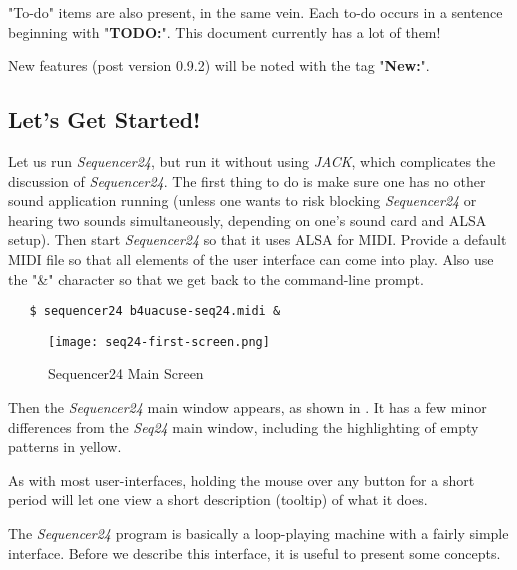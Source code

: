 \documentclass[
 11pt,
 twoside,
 a4paper,
 headinclude,
 footinclude,
 final                                 %
]{article}
\begin{document}
   "To-do" items
   are also present, in the same vein.
   Each to-do occurs in a sentence beginning with "\textbf{TODO:}".
   This document currently has a lot of them!

   New features (post version 0.9.2) will be noted with the tag
   "\textbf{New:}".

\subsection{Let's Get Started!}
\label{subsec:introduction_lets_get_started}

   Let us run \textsl{Sequencer24}, but run it without using \textsl{JACK},
   which complicates the discussion of \textsl{Sequencer24}.  The first
   thing to do is make sure one has no other sound application running
   (unless one wants to risk blocking \textsl{Sequencer24} or hearing two
    sounds simultaneously, depending on one's sound card and ALSA setup).
   Then start \textsl{Sequencer24} so that it uses ALSA for MIDI.  Provide a
   default MIDI file so that all elements of the user interface can come
   into play.  Also use the "\&" character so that we get back to the
   command-line prompt.


\begin{verbatim}
   $ sequencer24 b4uacuse-seq24.midi &
\end{verbatim}

\begin{figure}[H]
   \centering 
   \texttt{[image: seq24-first-screen.png]}
   \caption{Sequencer24 Main Screen}
   \label{fig:seq24_main_screen}
\end{figure}

   Then the \textsl{Sequencer24} main window appears, as shown in
   .  It has a few minor differences
   from the \textsl{Seq24} main window, including the highlighting of
   empty patterns in yellow.

   As with most user-interfaces, holding the mouse over any button for a
   short period will let one view a short description (tooltip)
   of what it does.

   The \textsl{Sequencer24} program is basically a loop-playing machine with a 
   fairly simple interface.  Before we describe this interface, it is useful
   to present some concepts.

\end{document}

